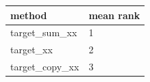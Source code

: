 \begin{tabular}{ll}
\toprule
method & mean rank \\
\midrule
target\_sum\_xx & 1 \\
target\_xx & 2 \\
target\_copy\_xx & 3 \\
\bottomrule
\end{tabular}

